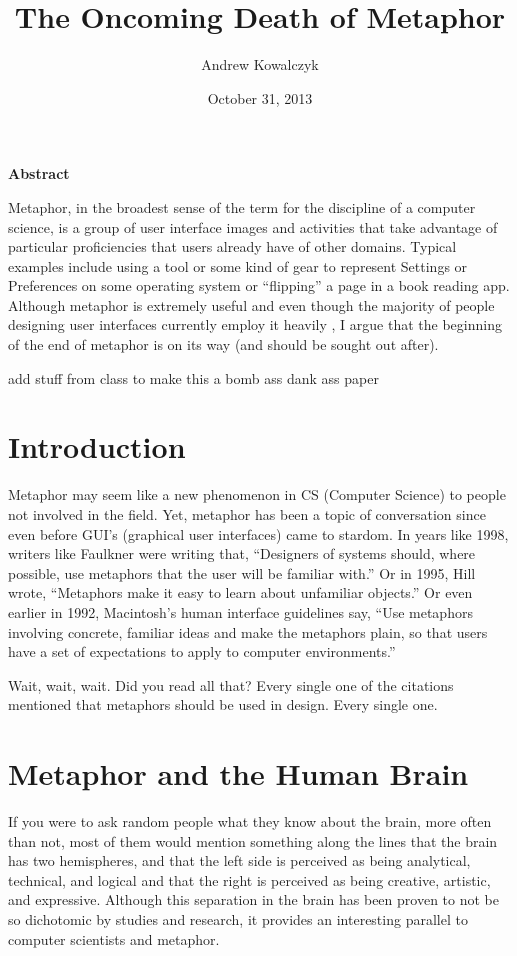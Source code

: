 \documentclass[11pt, oneside]{article}   	%
\title{The Oncoming Death of Metaphor}
\author{Andrew Kowalczyk}
\date{October 31, 2013}							%
\begin{document}
\maketitle
\centerline{\textbf{Abstract}}
Metaphor, in the broadest sense of the term for the discipline of a computer science, is a group of user interface images and activities that take advantage of particular proficiencies that users already have of other domains. Typical examples include using a tool or some kind of gear to represent Settings or Preferences on some operating system or ``flipping'' a page in a book reading app. Although metaphor is extremely useful and even though the majority of people designing user interfaces currently employ it heavily , I argue that the beginning of the end of metaphor is on its way (and should be sought out after).

add stuff from class to make this a bomb ass dank ass paper

\pagebreak
\section{Introduction \cite{reification}}

Metaphor may seem like a new phenomenon in CS (Computer Science) to people not involved in the field. Yet, metaphor has been a topic of conversation since even before GUI's (graphical user interfaces) came to stardom.
In years like 1998, writers like Faulkner were writing that, ``Designers of systems should, where possible, use metaphors that the user will be familiar with.'' \cite{essence}  Or in 1995, Hill wrote, ``Metaphors make it easy to learn about unfamiliar objects.'' \cite{practical} Or even earlier in 1992, Macintosh's human interface guidelines say, ``Use metaphors involving concrete, familiar ideas and make the metaphors plain, so that users have a set of expectations to apply to computer environments.'' \cite{apple}

Wait, wait, wait. Did you read all that? Every single one of the citations mentioned that metaphors should be used in design. Every single one.

\section{Metaphor and the Human Brain} 
If you were to ask random people what they know about the brain, more often than not, most of them would mention something along the lines that the brain has two hemispheres, and that the left side is perceived as being analytical, technical, and logical and that the right is perceived as being creative, artistic, and expressive. Although this separation in the brain has been proven to not be so dichotomic by studies and research, it provides an interesting parallel to computer scientists and metaphor.
\end{document}
